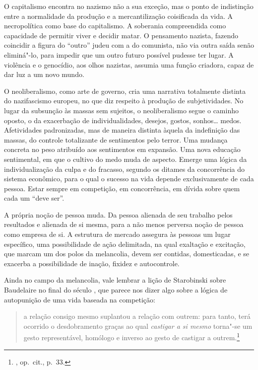 O capitalismo encontra no nazismo não a sua exceção, mas o ponto de
indistinção entre a normalidade da produção e a mercantilização
coisificada da vida. A necropolítica como base do capitalismo. A
soberania compreendida como capacidade de permitir viver e decidir
matar. O pensamento nazista, fazendo coincidir a figura do ``outro''
judeu com a do comunista, não via outra saída senão eliminá"-lo, para
impedir que um outro futuro possível pudesse ter lugar. A violência e o
genocídio, aos olhos nazistas, assumia uma função criadora, capaz de dar
luz a um novo mundo.

\asterisc

O neoliberalismo, como arte de governo, cria uma narrativa totalmente
distinta do nazifascismo europeu, no que diz respeito à produção de
subjetividades. No lugar da subsunção às massas sem sujeitos, o neoliberalismo
segue o caminho oposto, o da exacerbação de individualidades, desejos,
gostos, sonhos\ldots{} medos. Afetividades padronizadas, mas de maneira
distinta àquela da indefinição das massas, do controle totalizante de
sentimentos pelo terror. Uma mudança concreta no peso atribuído aos
sentimentos em expansão. Uma nova educação sentimental, em que o cultivo
do medo muda de aspecto. Emerge uma lógica da individualização da culpa
e do fracasso, segundo os ditames da concorrência do sistema econômico,
para o qual o sucesso na vida depende exclusivamente de cada pessoa.
Estar sempre em competição, em concorrência, em dívida sobre quem cada
um ``deve ser''.

A própria noção de pessoa muda. Da pessoa alienada de seu trabalho pelos
resultados e alienada de si mesma, para a não menos perversa noção de
pessoa como empresa de si. A estrutura de mercado assegura às pessoas
um lugar específico, uma possibilidade de ação delimitada, na qual
exaltação e excitação, que marcam um dos polos da melancolia, devem ser
contidas, domesticadas, e se exacerba a possibilidade de inação, fixidez
e autocontrole.

Ainda no campo da melancolia, vale lembrar a lição de Starobinski sobre
Baudelaire no final do século , que parece nos dizer algo sobre a
lógica de autopunição de uma vida baseada na competição:

\begin{quote}
a relação
consigo mesmo suplantou a relação com outrem: para tanto, terá ocorrido
o desdobramento graças ao qual \emph{castigar a si mesmo} torna"-se um
gesto representável, homólogo e inverso ao gesto de castigar a
outrem.\footnote{, op.~cit., p.~33.}
\end{quote}


